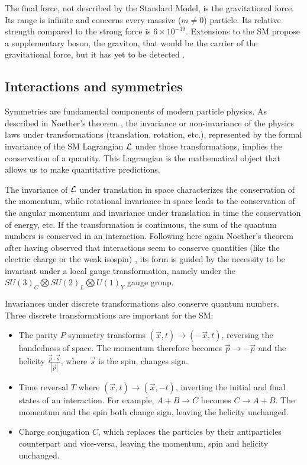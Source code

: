The final force, not described by the Standard Model, is the gravitational force. Its range is infinite and concerns every massive ($m \neq 0$) particle. Its relative strength compared to the strong force is $6\times 10^{-39}$. Extensions to the SM propose a supplementary boson, the graviton, that would be the carrier of the gravitational force, but it has yet to be detected \cite{ParticleDataGroup:2024cfk, carney_graviton_2024}.

\subsection{Interactions and symmetries}

Symmetries are fundamental components of modern particle physics. As described in Noether's theorem \cite{noether_invariant_1971}, the invariance or non-invariance of the physics laws under transformations (translation, rotation, etc.), represented by the formal invariance of the SM Lagrangian ${\cal L}$ under those transformations, implies the conservation of a quantity.
This Lagrangian is the mathematical object that allows us to make quantitative predictions.

The invariance of ${\cal L}$ under translation in space characterizes the conservation of the momentum, while rotational invariance in space leads to the conservation of the angular momentum and invariance under translation in time the conservation of energy, etc. If the transformation is continuous, the sum of the quantum numbers is conserved in an interaction.
Following here again Noether's theorem after having observed that interactions seem to conserve quantities (like the electric charge or the weak isospin) , its form is guided by the necessity to be invariant under a local gauge transformation, namely under the $SU(3)_C \bigotimes SU(2)_L \bigotimes U(1)_Y$ gauge group.

Invariances under discrete transformations also conserve quantum numbers. Three discrete transformations are important for the SM:
\begin{itemize}
  \item The parity $P$ symmetry transforms $(\vec{x}, t) \rightarrow (-\vec{x}, t)$, reversing the handedness of space. The momentum therefore becomes $\vec{p} \rightarrow -\vec{p}$ and the helicity $\frac{\vec{p} \cdot \vec{s}}{|\vec{p}|}$, where $\vec{s}$ is the spin, changes sign.

  \item Time reversal $T$ where $(\vec{x}, t) \rightarrow (\vec{x}, -t)$, inverting the initial and final states of an interaction. For example, $A + B \rightarrow C$ becomes $C \rightarrow A + B$. The momentum and the spin both change sign, leaving the helicity unchanged.

  \item Charge conjugation $C$, which replaces the particles by their antiparticles counterpart and vice-versa, leaving the momentum, spin and helicity unchanged.
\end{itemize}

